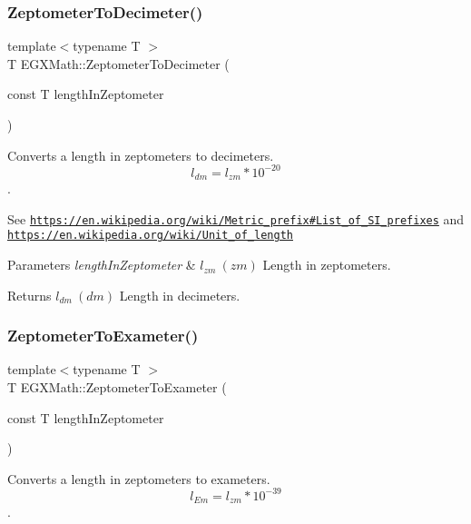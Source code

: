 \subsubsection{\texorpdfstring{Zeptometer\+To\+Decimeter()}{ZeptometerToDecimeter()}}
{\footnotesize\ttfamily template$<$typename T $>$ \\
T E\+G\+X\+Math\+::\+Zeptometer\+To\+Decimeter (\begin{DoxyParamCaption}\item[{const T}]{length\+In\+Zeptometer }\end{DoxyParamCaption})}



Converts a length in zeptometers to decimeters. \[ l_{dm}=l_{zm} * 10^{-20} \]. 

See \href{https://en.wikipedia.org/wiki/Metric_prefix#List_of_SI_prefixes}{\tt https\+://en.\+wikipedia.\+org/wiki/\+Metric\+\_\+prefix\#\+List\+\_\+of\+\_\+\+S\+I\+\_\+prefixes} and \href{https://en.wikipedia.org/wiki/Unit_of_length}{\tt https\+://en.\+wikipedia.\+org/wiki/\+Unit\+\_\+of\+\_\+length} 
\begin{DoxyParams}{Parameters}
{\em length\+In\+Zeptometer} & $ l_{zm}\ (zm)$ Length in zeptometers. \\
\hline
\end{DoxyParams}
\begin{DoxyReturn}{Returns}
$ l_{dm}\ (dm)$ Length in decimeters. 
\end{DoxyReturn}
\mbox{\label{group___e_g_x_math-_conversions-_length_conversions-_zeptometer-_s_i_ga28d70f8fb1a2876c4c8553348c78925d}} 
\subsubsection{\texorpdfstring{Zeptometer\+To\+Exameter()}{ZeptometerToExameter()}}
{\footnotesize\ttfamily template$<$typename T $>$ \\
T E\+G\+X\+Math\+::\+Zeptometer\+To\+Exameter (\begin{DoxyParamCaption}\item[{const T}]{length\+In\+Zeptometer }\end{DoxyParamCaption})}



Converts a length in zeptometers to exameters. \[ l_{Em}=l_{zm} * 10^{-39} \]. 

